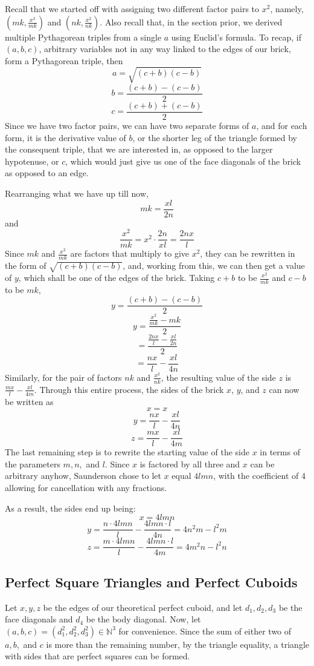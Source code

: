 \documentclass[11pt]{article}
\begin{document}
\begin{appendices}
Recall that we started off with assigning two different factor pairs to $x^2$, namely, $(mk, \frac{x^2}{mk})$ and $(nk, \frac{x^2}{nk})$. Also recall that, in the section prior, we derived multiple Pythagorean triples from a single $a$ using Euclid's formula. To recap, if $(a, b, c)$, arbitrary variables not in any way linked to the edges of our brick, form a Pythagorean triple,
then 
$$a=\sqrt{(c+b)(c-b)}$$
$$b=\frac{(c+b)-(c-b)}{2}$$
$$c=\frac{(c+b)+(c-b)}{2}$$
Since we have two factor pairs, we can have two separate forms of $a$, and for each form, it is the derivative value of $b$, or the shorter leg of the triangle formed by the consequent triple, that we are interested in, as opposed to the larger hypotenuse, or $c$, which would just give us one of the face diagonals of the brick as opposed to an edge.

Rearranging what we have up till now,
$$mk=\frac{xl}{2n}$$
and 
$$\frac{x^2}{mk}=x^2\cdot{\frac{2n}{xl}}=\frac{2nx}{l}$$
Since $mk$ and $\frac{x^2}{mk}$ are factors that multiply to give $x^2$, they can be rewritten in the form of $\sqrt{(c+b)(c-b)}$, and, working from this, we can then get a value of $y$, which shall be one of the edges of the brick. Taking $c+b$ to be $\frac{x^2}{mk}$ and $c-b$ to be $mk$, 
$$y=\frac{(c+b)-(c-b)}{2}$$
$$y=\frac{\frac{x^2}{mk}-mk}{2}$$
$$=\frac{\frac{2nx}{l}-\frac{xl}{2n}}{2}$$
$$=\frac{nx}{l}-\frac{xl}{4n}$$
Similarly, for the pair of factors $nk$ and $\frac{x^2}{nk}$, the resulting value of the side $z$ is $\frac{mx}{l}-\frac{xl}{4m}$.
Through this entire process, the sides of the brick $x$, $y$, and $z$ can now be written as
$$x=x$$
$$y=\frac{nx}{l}-\frac{xl}{4n}$$
$$z=\frac{mx}{l}-\frac{xl}{4m}$$
The last remaining step is to rewrite the starting value of the side $x$ in terms of the parameters $m, n,$ and $l$. Since $x$ is factored by all three and $x$ can be arbitrary anyhow, Saunderson chose to let $x$ equal $4lmn$, with the coefficient of 4 allowing for cancellation with any fractions.

As a result, the sides end up being:
$$x=4lmn$$
$$y=\frac{n\cdot{4lmn}}{l}-\frac{4lmn\cdot{l}}{4n}=4n^2m-l^2m$$
$$z=\frac{m\cdot{4lmn}}{l}-\frac{4lmn\cdot{l}}{4m}=4m^2n-l^2n$$

\subsection{Perfect Square Triangles and Perfect Cuboids}
Let $x, y, z$ be the edges of our theoretical perfect cuboid, and let $d_1, d_2, d_3$ be the face diagonals and $d_4$ be the body diagonal. Now, let $(a, b, c)=(d_1^2, d_2^2, d_3^2)\in{\mathbb{N}^3}$ for convenience. Since the sum of either two of $a, b,$ and $c$ is more than the remaining number, by the triangle equality, a triangle with sides that are perfect squares can be formed.


\end{appendices}
\end{document}
